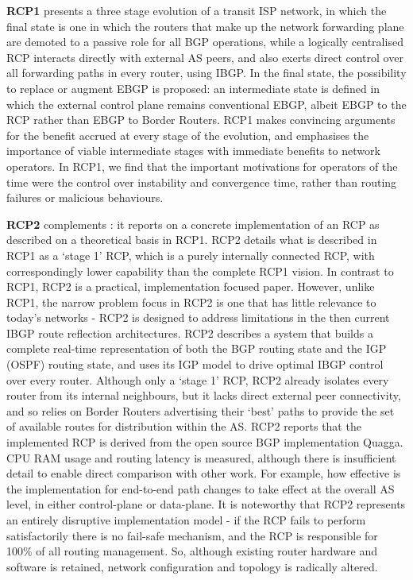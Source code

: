 \textbf{RCP1} \cite{Feamster2004} presents a three stage evolution of a transit ISP network, in which the final state is one in which the routers that make up the network forwarding plane are demoted to a passive role for all BGP operations, while a logically centralised RCP interacts directly with external AS peers, and also exerts direct control over all forwarding paths in every router, using IBGP.
In the final state, the possibility to replace or augment EBGP is proposed: an intermediate state is defined in which the external control plane remains conventional EBGP, albeit EBGP to the RCP rather than EBGP to Border Routers.
RCP1 makes convincing arguments for the benefit accrued at every stage of the evolution, and emphasises the importance of viable intermediate stages with immediate benefits to network operators.
In RCP1, we find that the important motivations for operators of the time were the control over instability and convergence time, rather than routing failures or malicious behaviours.

\bigskip

\textbf{RCP2} \cite{Caesar2005} complements \cite{Feamster2004}: it reports on a concrete implementation of an RCP as described on a theoretical basis in RCP1.
RCP2 details what is described in RCP1 as a `stage 1' RCP, which is a purely internally connected RCP, with correspondingly lower capability than the complete RCP1 vision.
In contrast to RCP1, RCP2 is a practical, implementation focused paper.
However, unlike RCP1, the narrow problem focus in RCP2 is one that has little relevance to today's networks - RCP2 is designed to address limitations in the then current IBGP route reflection architectures.
RCP2 describes a system that builds a complete real-time representation of both the BGP routing state and the IGP (OSPF) routing state, and uses its IGP model to drive optimal IBGP control over every router.
Although only a `stage 1' RCP, RCP2 already isolates every router from its internal neighbours, but it lacks direct external peer connectivity, and so relies on Border Routers advertising their `best' paths to provide the set of available routes for distribution within the AS.
RCP2 reports that the implemented RCP is derived from the open source BGP implementation Quagga.
CPU RAM usage and routing latency is measured, although there is insufficient detail to enable direct comparison with other work. For example, how effective is the implementation for end-to-end path changes to take effect at the overall AS level, in either control-plane or data-plane.
It is noteworthy that RCP2 represents an entirely disruptive implementation model - if the RCP fails to perform satisfactorily there is no fail-safe mechanism, and the RCP is responsible for 100\% of all routing management.
So, although existing router hardware and software is retained, network configuration and topology is radically altered.

